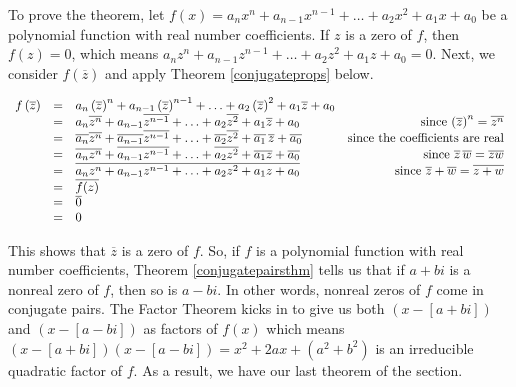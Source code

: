 \documentclass{ximera}
\begin{document}



To prove the theorem, let 
$ f(x) = a_{n} x^{n} + a_{n-1} x^{n-1} + \ldots + a_2 x^2 + a_1 x + a_0$ be a polynomial function with real number coefficients.  If $z$ is a zero of $f$, then $f(z) = 0$, which means $a_{n} z^{n} + a_{n-1} z^{n-1} + \ldots + a_2 z^2 + a_1 z + a_0 = 0$.  Next, we consider $f\left(\overline{z}\right)$ and apply Theorem \ref{conjugateprops} below.

\[ \begin{array}{rclr}

 f\left(\overline{z}\right) & = &  a_{n} \left(\overline{z}\right)^{n} + a_{n-1} \left(\overline{z}\right)^{n-1} + \ldots + a_2\left( \overline{z}\right)^2 + a_1 \overline{z} + a_0 & \\  
 
 &  = & a_{n}\overline{z^{n}} + a_{n-1}\overline{z^{n-1}} + \ldots + a_2\overline{z^2} + a_1 \overline{z} + a_0 & \mbox{ since $\left(\overline{z}\right)^n = \overline{z^{n}}$}\\  
 
 & = & \overline{a_{n}}\overline{z^{n}} + \overline{a_{n-1}}\overline{z^{n-1}} + \ldots +  \overline{a_2}\overline{z^2} + \overline{a_1}\, \overline{z} + \overline{a_0} & \mbox{since the coefficients are real} \\  
 
 & = & \overline{a_{n} z^{n}} + \overline{a_{n-1} z^{n-1}} + \ldots +  \overline{a_2 z^2} + \overline{a_1 z} + \overline{a_0} &  \mbox{ since $\overline{z} \, \overline{w}=\overline{zw} $}\\  
 
 & = & \overline{a_{n} z^{n} + a_{n-1} z^{n-1} + \ldots + a_2 z^2 + a_1 z + a_0} & \mbox{ since $ \overline{z} + \overline{w} = \overline{z+w} $}\\  
 
 & = & \overline{f(z)} & \\  
 
 & = & \overline{0} & \\  
 
 & = & 0 & \\
 
\end{array} \]

This shows that $\overline{z}$ is a zero of $f$.  So, if $f$ is a polynomial function with real number coefficients, Theorem \ref{conjugatepairsthm} tells us that if $a+bi$ is a nonreal zero of $f$, then so is $a-bi$.  In other words, nonreal zeros of $f$ come in conjugate pairs.  The Factor Theorem kicks in to give us both $(x-[a+bi])$ and $(x-[a-bi])$ as factors of $f(x)$ which means $(x-[a+bi])(x-[a-bi]) = x^2 + 2a x + \left(a^2+b^2\right)$ is an irreducible quadratic factor of $f$.  As a result, we have our last theorem of the section.
\end{document}
